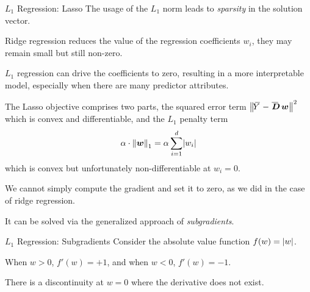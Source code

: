 \begin{frame}{$L_1$ Regression: Lasso}
The usage of the $L_1$ norm leads to {\em
sparsity} in the solution vector. 

	\medskip

Ridge regression reduces the value of the regression coefficients $w_i$, 
they may remain small but still non-zero. 
\medskip

$L_1$ regression can drive
the coefficients to zero, resulting in a more interpretable model,
especially when there are many predictor attributes.

\medskip

The Lasso objective comprises two parts, the squared error term
$\norm{\mY-\mbD\;\bw}^2$ which is convex and differentiable, and the $L_1$
penalty term 
$$\alpha \cdot \left\lVert{\boldsymbol w}\right\rVert_1 = \alpha \sum^{d}_{i=1} \lvert w_i\rvert$$ 
which is convex but unfortunately non-differentiable at $w_i
= 0$. 

\medskip

We cannot simply compute the gradient and set it
to zero, as we did in the case of ridge regression.

\medskip

It can be solved via the generalized approach of {\em subgradients}.
\end{frame}
%
%
\begin{frame}{$L_1$ Regression: Subgradients}
Consider the absolute value function $f(w) = \lvert w\rvert$.
    
\medskip

When $w > 0$, $f'(w) = +1$, and
    when $w<0$, $f'(w) = -1$. 

\medskip

There is a discontinuity at $w=0$ where the derivative does not exist. 
    
\vspace*{0.5cm}

    \centering
\end{frame}

